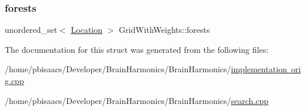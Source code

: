 \subsubsection{\texorpdfstring{forests}{forests}}
{\footnotesize\ttfamily unordered\+\_\+set$<$ \mbox{\hyperlink{structSquareGrid_a2c9a2cbd3912aa48ac97289abc3f1c0f}{Location}} $>$ Grid\+With\+Weights\+::forests}



The documentation for this struct was generated from the following files\+:\begin{DoxyCompactItemize}
\item 
/home/pbisaacs/\+Developer/\+Brain\+Harmonics/\+Brain\+Harmonics/\mbox{\hyperlink{implementation_01orig_8cpp}{implementation orig.\+cpp}}\item 
/home/pbisaacs/\+Developer/\+Brain\+Harmonics/\+Brain\+Harmonics/\mbox{\hyperlink{search_8cpp}{search.\+cpp}}\end{DoxyCompactItemize}
